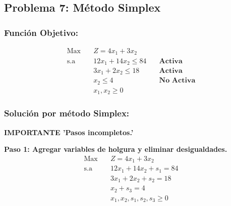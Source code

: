 \documentclass{templateNote}
\begin{document}
\subsection*{Problema 7: Método Simplex}
\subsubsection*{Función Objetivo:}
\begin{equation*}
    \begin{aligned}
        \text{Max} \quad & Z = 4x_1 + 3x_2 \\
        \text{s.a} \quad & 12x_1 + 14x_2 \leq 84 \quad & \textbf{Activa} \\
        & 3x_1 + 2x_2 \leq 18 \quad & \textbf{Activa} \\
        & x_2 \leq 4 \quad & \textbf{No Activa} \\
        & x_1, x_2 \geq 0
    \end{aligned}
\end{equation*}

\subsubsection*{Solución por método Simplex:}
\textbf{IMPORTANTE 'Pasos incompletos.'}

\textbf{Paso 1: Agregar variables de holgura y eliminar desigualdades.}
\begin{equation*}
    \begin{aligned}
        \text{Max} \quad & Z = 4x_1 + 3x_2 \\
        \text{s.a} \quad & 12x_1 + 14x_2 + s_1 = 84 \\
        & 3x_1 + 2x_2 + s_2 = 18 \\
        & x_2 + s_3 = 4\\
        & x_1, x_2, s_1, s_2, s_3 \geq 0
    \end{aligned}
\end{equation*}
\end{document}
